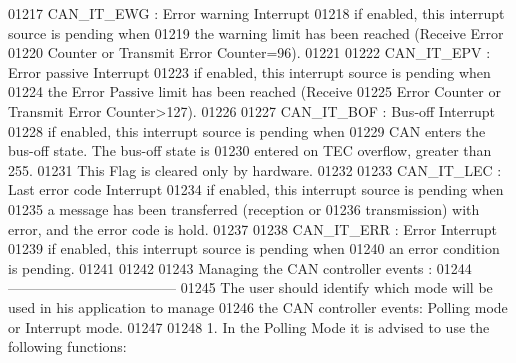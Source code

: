 \begin{DoxyCode}
01217 \textcolor{comment}{        CAN\_IT\_EWG     :  Error warning Interrupt }
01218 \textcolor{comment}{                          if enabled, this interrupt source is pending when}
01219 \textcolor{comment}{                          the warning limit has been reached (Receive Error }
01220 \textcolor{comment}{                          Counter or Transmit Error Counter=96). }
01221 \textcolor{comment}{                               }
01222 \textcolor{comment}{        CAN\_IT\_EPV     :  Error passive Interrupt        }
01223 \textcolor{comment}{                          if enabled, this interrupt source is pending when}
01224 \textcolor{comment}{                          the Error Passive limit has been reached (Receive }
01225 \textcolor{comment}{                          Error Counter or Transmit Error Counter>127).}
01226 \textcolor{comment}{                          }
01227 \textcolor{comment}{        CAN\_IT\_BOF     :  Bus-off Interrupt}
01228 \textcolor{comment}{                          if enabled, this interrupt source is pending when}
01229 \textcolor{comment}{                          CAN enters the bus-off state. The bus-off state is }
01230 \textcolor{comment}{                          entered on TEC overflow, greater than 255.}
01231 \textcolor{comment}{                          This Flag is cleared only by hardware.}
01232 \textcolor{comment}{                                  }
01233 \textcolor{comment}{        CAN\_IT\_LEC     :  Last error code Interrupt        }
01234 \textcolor{comment}{                          if enabled, this interrupt source is pending  when}
01235 \textcolor{comment}{                          a message has been transferred (reception or}
01236 \textcolor{comment}{                          transmission) with error, and the error code is hold.}
01237 \textcolor{comment}{                          }
01238 \textcolor{comment}{        CAN\_IT\_ERR     :  Error Interrupt}
01239 \textcolor{comment}{                          if enabled, this interrupt source is pending when }
01240 \textcolor{comment}{                          an error condition is pending.      }
01241 \textcolor{comment}{                      }
01242 \textcolor{comment}{}
01243 \textcolor{comment}{  Managing the CAN controller events :}
01244 \textcolor{comment}{  ------------------------------------ }
01245 \textcolor{comment}{  The user should identify which mode will be used in his application to manage }
01246 \textcolor{comment}{  the CAN controller events: Polling mode or Interrupt mode.}
01247 \textcolor{comment}{  }
01248 \textcolor{comment}{  1.  In the Polling Mode it is advised to use the following functions:}

\end{DoxyCode}
